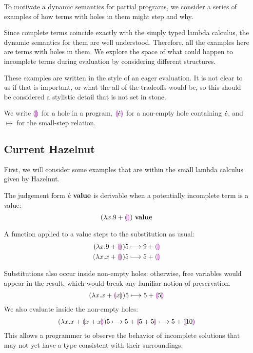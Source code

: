 To motivate a dynamic semantics for partial programs, we consider a series
of examples of how terms with holes in them might step and why.

Since complete terms coincide exactly with the simply typed lambda
calculus, the dynamic semantics for them are well understood. Therefore,
all the examples here are terms with holes in them. We explore the space of
what could happen to incomplete terms during evaluation by considering
different structures.

These examples are written in the style of an eager evaluation. It is not
clear to us if that is important, or what the all of the tradeoffs would
be, so this should be considered a stylistic detail that is not set in
stone.

We write $\textcolor{violet}{\llparenthesis}\textcolor{violet}{\rrparenthesis}$ for a hole in a program, $\textcolor{violet}{\llparenthesis}\dot{e}\textcolor{violet}{\rrparenthesis}$ for a non-empty
hole containing $\dot{e}$, and $\mapsto$ for the small-step relation.

\subsection{Current Hazelnut}
First, we will consider some examples that are within the small lambda
calculus given by Hazelnut.

The judgement form ${\dot{e}} ~\mathbf{value}$ is derivable when a potentially
incomplete term is a value:
\begin{align*}
  {(\lambda x. 9 + \textcolor{violet}{\llparenthesis}\textcolor{violet}{\rrparenthesis})} ~\mathbf{value}
\end{align*}

A function applied to a value steps to the substitution as usual:
\begin{align*}
  {
        (\lambda x.9 + \textcolor{violet}{\llparenthesis}\textcolor{violet}{\rrparenthesis})5
      } \longmapsto {
        9 + \textcolor{violet}{\llparenthesis}\textcolor{violet}{\rrparenthesis}}
      \\
      {
        (\lambda x.x + \textcolor{violet}{\llparenthesis}\textcolor{violet}{\rrparenthesis})5
      } \longmapsto {
        5 + \textcolor{violet}{\llparenthesis}\textcolor{violet}{\rrparenthesis}}
\end{align*}

Substitutions also occur inside non-empty holes: otherwise, free variables
would appear in the result, which would break any familiar notion of
preservation.
\begin{align*}
  {
        (\lambda x.x + \textcolor{violet}{\llparenthesis}x\textcolor{violet}{\rrparenthesis})5
      } \longmapsto {
        5 + \textcolor{violet}{\llparenthesis}5\textcolor{violet}{\rrparenthesis}}
\end{align*}
We also evaluate inside the non-empty holes:
\begin{align*}
  {
    {
          (\lambda x.x + \textcolor{violet}{\llparenthesis}x + x\textcolor{violet}{\rrparenthesis})5
        } \longmapsto {
          5 + \textcolor{violet}{\llparenthesis}5 + 5\textcolor{violet}{\rrparenthesis}}
  } \longmapsto {5 + \textcolor{violet}{\llparenthesis}10\textcolor{violet}{\rrparenthesis}}
\end{align*}
This allows a programmer to observe the behavior of incomplete solutions
that may not yet have a type consistent with their surroundings.

